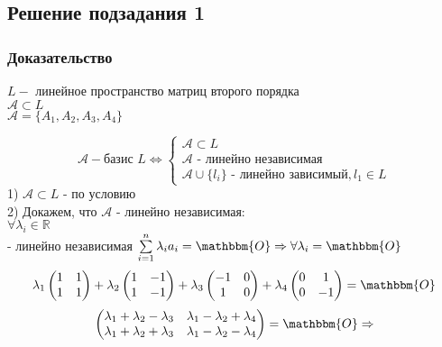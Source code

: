 \documentclass{article}
\begin{document}
    \subsection{Решение подзадания 1}
    \subsubsection{Доказательство}
    $L - $ линейное пространство матриц второго порядка \\
    $\mathcal{A} \subset L$ \\
    $\mathcal{A} = \{A_1, A_2, A_3, A_4 \}$

    \[
    \mathcal{A} - \text{базис } L \iff 
    \begin{cases}
        \mathcal{A} \subset L \\
        \mathcal{A} \text{ - линейно независимая} \\
        \mathcal{A} \cup \{l_i\} \text{ - линейно зависимый}, l_1 \in L
    \end{cases}
    \]
    1) $\mathcal{A} \subset L$ - по условию \\
    2) Докажем, что $\mathcal{A} \text{ - линейно независимая}$: \\
    $\forall \lambda_i \in \mathbb{R}$ \\
     - линейно независимая \iff $\sum\limits_{i=1}^n \lambda_i a_i = \mathbbm{O} \Rightarrow \forall \lambda_i = \mathbbm{O}$ \\
    \[\lambda_1
    \begin{pmatrix}
        1 & 1 \\
        1 & 1 \\
    \end{pmatrix}
    + \lambda_2
    \begin{pmatrix}
        1 & -1 \\
        1 & -1 \\
    \end{pmatrix}
    + \lambda_3
    \begin{pmatrix}
        -1 & 0 \\
        1 & 0 \\
    \end{pmatrix}
    + \lambda_4
    \begin{pmatrix}
        0 & 1 \\
        0 & -1 \\
    \end{pmatrix}
    = \mathbbm{O}
    \]
    \[
    \begin{pmatrix}
        \lambda_1 + \lambda_2 - \lambda_3 & \lambda_1 - \lambda_2 + \lambda_4 \\
        \lambda_1 + \lambda_2 + \lambda_3 & \lambda_1 - \lambda_2 - \lambda_4 \\
    \end{pmatrix}
    = \mathbbm{O} \Rightarrow
    \]
\end{document}
